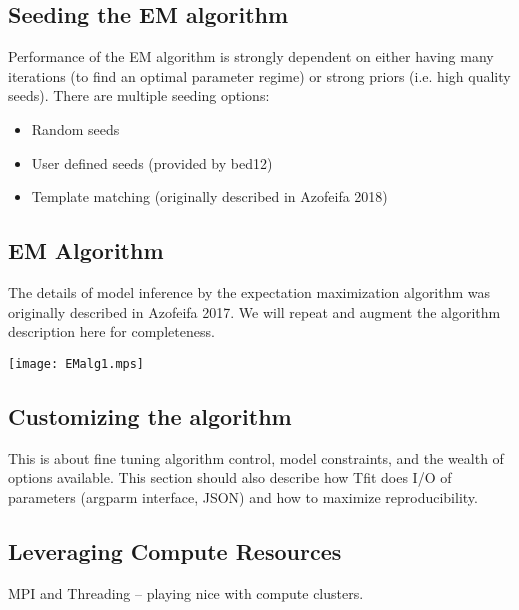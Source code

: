 \documentclass[11pt]{article}
\begin{document}
\subsection{Seeding the EM algorithm}
\label{seeds}
Performance of the EM algorithm is strongly dependent on either having 
many iterations (to find an optimal parameter regime) or strong priors
(i.e. high quality seeds).  There are multiple seeding options:

\begin{itemize}
\item Random seeds
\item User defined seeds (provided by bed12)
\item Template matching (originally described in Azofeifa 2018)
\end{itemize}

\subsection{EM Algorithm}
The details of model inference by the expectation maximization algorithm was
originally described in Azofeifa 2017.  We will repeat and augment the 
algorithm description here for completeness.

\texttt{[image: EMalg1.mps]}

\subsection{Customizing the algorithm}
This is about fine tuning algorithm control, model constraints, and 
the wealth of options available.   This section should also describe 
how Tfit does I/O of parameters (argparm interface, JSON) and how
to maximize reproducibility. 

\subsection{Leveraging Compute Resources}
MPI and Threading -- playing nice with compute clusters.

\small{
  
  {}
}
\end{document}
